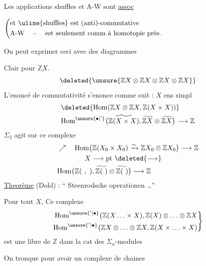 Les applications shuffles et A-W sont \uline{assoc}

\(\left(\begin{aligned}
&\text{et \uline{shuffles} est (anti)-commutative}\\
&\text{A-W \quad - \quad est seulement comm à homotopie près.}
\end{aligned}\right.\)

On peut exprimer ceci avec des diagrammes  


Clair pour \(\underline{\mathbb ZX}\).
\[
\deleted{\unsure{\mathbb ZX\otimes\mathbb ZX\otimes\mathbb ZX\otimes\mathbb ZX}}
\]
L'enoncé de commutativité s'enonce comme suit : \hfill \(X\) ens simpl
\[
\begin{aligned}
&\deleted{\mathrm{Hom}(\mathbb ZX\otimes\mathbb ZX,\mathbb Z(X\times X))}\\
&\mathrm{Hom}^{\unsure{\bullet|'}}\bigl(\widetilde{\mathbb Z(X\times X)},\widetilde{\mathbb ZX}\otimes\widetilde{\mathbb ZX}\bigr)\longrightarrow\mathbb Z
\end{aligned}
\]
\(\Sigma_2\) agit sur ce complexe
\[
\begin{aligned}
&\nearrow\quad\mathrm{Hom}\bigl(\mathbb Z(X_0\times X_0)\xrightarrow{\sim}\mathbb ZX_0\otimes\mathbb ZX_0\bigr)\longrightarrow\mathbb Z\\
&\hspace{4em} X\longrightarrow\mathrm{pt}\ \deleted{\longrightarrow}\\
&\mathrm{Hom}\bigl(\mathbb Z(\ ,\ ),\widetilde{\mathbb Z(\ )}\otimes\widetilde{\mathbb Z(\ )}\bigr)\longrightarrow\mathbb Z
\end{aligned}
\]
\uline{Theorème} (Dold) : \textquotedblleft{}  Steenrodsche operationen \ldots\textquotedblright

Pour tout \(X\), Ce complexe
\[
\left.\begin{aligned}
\mathrm{Hom}^{\unsure{'|\bullet}}\bigl(\mathbb Z(X\ldots\times X),\mathbb Z(X)\otimes\ldots\otimes\mathbb ZX\\
\mathrm{Hom}^{\unsure{'|\bullet}}\bigl(\mathbb ZX\otimes\ldots\otimes\mathbb ZX,\mathbb Z(X\times\ldots\times X)
\end{aligned}\right\}
\]
est une  libre de \(\mathbb Z\) dans la cat des \(\Sigma_n\)-modules


On tronque pour avoir un complexe de chaines
